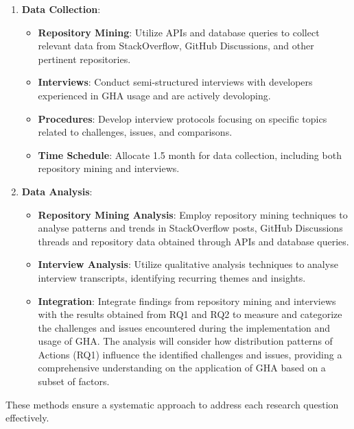 \documentclass[conference]{IEEEtran}
\begin{document}
\begin{enumerate}
    \item \textbf{Data Collection}:\\
    \begin{itemize}
        \item \textbf{Repository Mining}: Utilize APIs and database queries to collect relevant data from StackOverflow, GitHub Discussions, and other pertinent repositories.
        \item \textbf{Interviews}: Conduct semi-structured interviews with developers experienced in GHA usage and are actively devoloping.
        \item \textbf{Procedures}: Develop interview protocols focusing on specific topics related to challenges, issues, and comparisons.
        \item \textbf{Time Schedule}: Allocate 1.5 month for data collection, including both repository mining and interviews.\\
    \end{itemize}
    
    \item \textbf{Data Analysis}:\\
    \begin{itemize}
        \item \textbf{Repository Mining Analysis}: Employ repository mining techniques to analyse patterns and trends in StackOverflow posts, GitHub Discussions threads and repository data obtained through APIs and database queries.
        \item \textbf{Interview Analysis}: Utilize qualitative analysis techniques to analyse interview transcripts, identifying recurring themes and insights.
        \item \textbf{Integration}: Integrate findings from repository mining and interviews with the results obtained from RQ1 and RQ2 to measure and categorize the challenges and issues encountered during the implementation and usage of GHA. The analysis will consider how distribution patterns of Actions (RQ1) influence the identified challenges and issues, providing a comprehensive understanding on the application of GHA based on a subset of factors.\\
    \end{itemize}
\end{enumerate}

These methods ensure a systematic approach to address each research question effectively.\\
\end{document}
